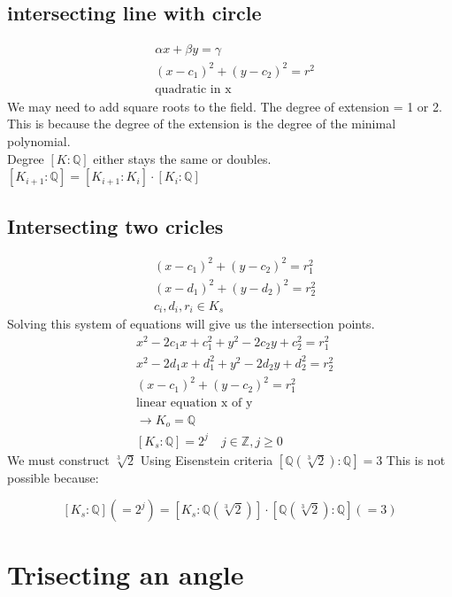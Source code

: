 \documentclass{article}
\begin{document}
\subsection{intersecting line with circle }
\begin{align*}
    &\alpha x + \beta y = \gamma \\
    &(x- c_1)^2 + (y-c_2)^2 = r^2 \\ 
    &\text{quadratic in x}
\end{align*}
We may need to add square roots to the field. The degree of extension = 1 or 2. This is because the degree of the extension is the degree of the minimal polynomial. \\ 
Degree $[K : \mathbb{Q}]$ either stays the same or doubles. \\
$[K_{i+1}: \mathbb{Q}] = [K_{i+1} : K_i] \cdot [K_i : \mathbb{Q}]$ \\

\subsection{Intersecting two cricles }
\begin{align*}
    &(x-c_1)^2 + (y-c_2)^2 = r_1^2 \\
    &(x-d_1)^2 + (y-d_2)^2 = r_2^2 \\
    &c_i, d_i, r_i \in K_s
\end{align*}
Solving this system of equations will give us the intersection points. \\
\begin{align*}
    &x^2 - 2c_1x + c_1^2 + y^2 - 2c_2y + c_2^2 = r_1^2 \\
    &x^2 - 2d_1x + d_1^2 + y^2 - 2d_2y + d_2^2 = r_2^2 \\
    &(x-c_1)^2 + (y-c_2)^2 = r_1^2 \\
    &\text{linear equation x of y} \\ 
    &\rightarrow K_o = \mathbb{Q} \\ 
    &[K_s:\mathbb{Q}] = 2^j \quad j \in \mathbb{Z}, j \geq 0
\end{align*}
We must construct $\sqrt[3]{2}$ Using Eisenstein criteria $[\mathbb{Q}(\sqrt[3]{2}) : \mathbb{Q}] = 3$ This is not possible because: 

$$[K_s:\mathbb{Q}] ( = 2^j)= [K_s:\mathbb{Q}(\sqrt[3]{2})] \cdot [\mathbb{Q}(\sqrt[3]{2}):\mathbb{Q}] (=3)$$ 
\section{Trisecting an angle}
\end{document}
